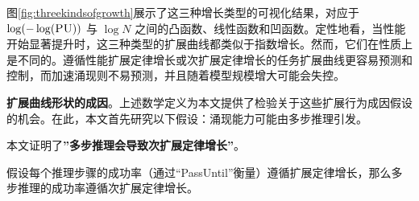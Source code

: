 图\ref{fig:threekindsofgrowth}展示了这三种增长类型的可视化结果，对应于 $\log(-\log(\textsc{PU}))$ 与 $\log N$ 之间的凸函数、线性函数和凹函数。定性地看，当性能开始显著提升时，这三种类型的扩展曲线都类似于指数增长。然而，它们在性质上是不同的。遵循性能扩展定律增长或次扩展定律增长的任务扩展曲线更容易预测和控制，而加速涌现则不易预测，并且随着模型规模增大可能会失控。

{\textbf{扩展曲线形状的成因}。上述数学定义为本文提供了检验关于这些扩展行为成因假设的机会。在此，本文首先研究以下假设：涌现能力可能由多步推理引发\citep{srivastava2022beyond, wei2022emergent, schaeffer2023emergent}。}

本文证明了\textbf{”多步推理会导致次扩展定律增长”}。

\begin{theorem}
假设每个推理步骤的成功率（通过“PassUntil”衡量）遵循扩展定律增长，那么多步推理的成功率遵循次扩展定律增长。
\end{theorem}



